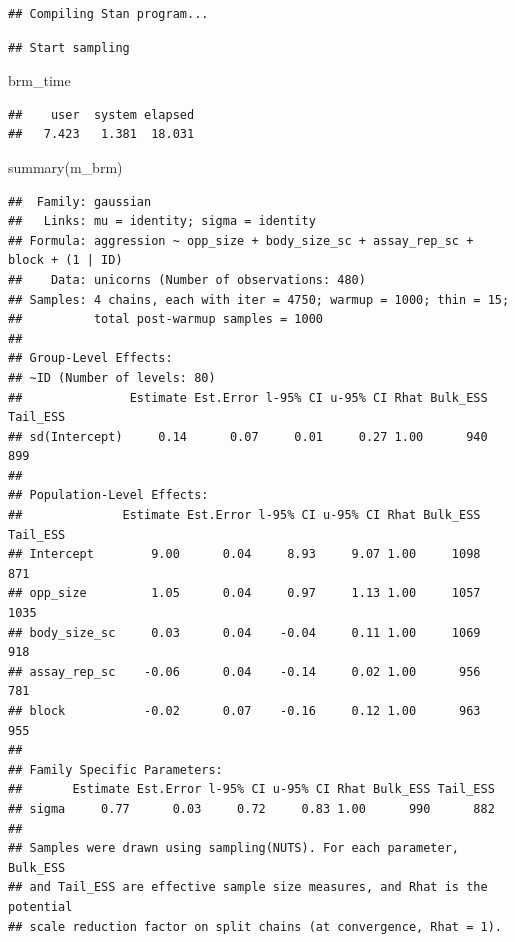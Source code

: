 \documentclass[
  12pt,
]{book}
\newenvironment{Shaded}{\begin{snugshade}}{\end{snugshade}}
\newcommand{\FunctionTok}[1]{\textcolor[rgb]{0.00,0.00,0.00}{#1}}
\newcommand{\NormalTok}[1]{#1}
\begin{document}
\begin{verbatim}
## Compiling Stan program...
\end{verbatim}

\begin{verbatim}
## Start sampling
\end{verbatim}

\begin{Shaded}
\begin{Highlighting}[]
\NormalTok{brm\_time}
\end{Highlighting}
\end{Shaded}

\begin{verbatim}
##    user  system elapsed 
##   7.423   1.381  18.031
\end{verbatim}

\begin{Shaded}
\begin{Highlighting}[]
\FunctionTok{summary}\NormalTok{(m\_brm)}
\end{Highlighting}
\end{Shaded}

\begin{verbatim}
##  Family: gaussian 
##   Links: mu = identity; sigma = identity 
## Formula: aggression ~ opp_size + body_size_sc + assay_rep_sc + block + (1 | ID) 
##    Data: unicorns (Number of observations: 480) 
## Samples: 4 chains, each with iter = 4750; warmup = 1000; thin = 15;
##          total post-warmup samples = 1000
## 
## Group-Level Effects: 
## ~ID (Number of levels: 80) 
##               Estimate Est.Error l-95% CI u-95% CI Rhat Bulk_ESS Tail_ESS
## sd(Intercept)     0.14      0.07     0.01     0.27 1.00      940      899
## 
## Population-Level Effects: 
##              Estimate Est.Error l-95% CI u-95% CI Rhat Bulk_ESS Tail_ESS
## Intercept        9.00      0.04     8.93     9.07 1.00     1098      871
## opp_size         1.05      0.04     0.97     1.13 1.00     1057     1035
## body_size_sc     0.03      0.04    -0.04     0.11 1.00     1069      918
## assay_rep_sc    -0.06      0.04    -0.14     0.02 1.00      956      781
## block           -0.02      0.07    -0.16     0.12 1.00      963      955
## 
## Family Specific Parameters: 
##       Estimate Est.Error l-95% CI u-95% CI Rhat Bulk_ESS Tail_ESS
## sigma     0.77      0.03     0.72     0.83 1.00      990      882
## 
## Samples were drawn using sampling(NUTS). For each parameter, Bulk_ESS
## and Tail_ESS are effective sample size measures, and Rhat is the potential
## scale reduction factor on split chains (at convergence, Rhat = 1).
\end{verbatim}
\end{document}
